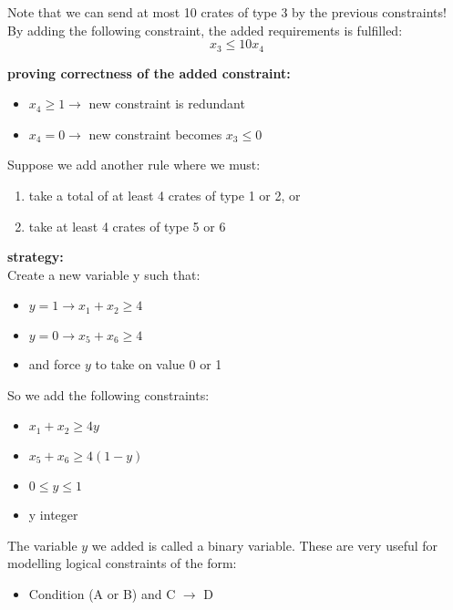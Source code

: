 \documentclass[letterpaper, 12pt]{article}
\begin{document}
    Note that we can send at most 10 crates of type 3 by the previous constraints!\\
    By adding the following constraint, the added requirements is fulfilled:
    $$ x_3 \leq 10x_4$$

    \pagebreak
    \textbf{proving correctness of the added constraint:}
    \begin{itemize}
        \item $x_4 \geq 1 \rightarrow$  new constraint is redundant
        \item $x_4 = 0 \rightarrow$  new constraint becomes $x_3 \leq 0$
    \end{itemize}

    Suppose we add another rule where we must:\\
    \begin{enumerate}
        \item take a total of at least 4 crates of type 1 or 2, or
        \item take at least 4 crates of type 5 or 6
    \end{enumerate}

    \textbf{strategy:}\\
    Create a new variable y such that:
    \begin{itemize}
        \item $y = 1 \rightarrow x_1 + x_2 \geq 4$
        \item $y = 0 \rightarrow x_5 + x_6 \geq 4$
        \item and force $y$ to take on value 0 or 1
    \end{itemize}

    So we add the following constraints:\\
    \begin{itemize}
        \item $x_1 + x_2 \geq 4y$
        \item $x_5 + x_6 \geq 4(1 - y)$
        \item $0 \leq y \leq 1$
        \item y integer
    \end{itemize}

    The variable $y$ we added is called a binary variable. These are very useful for modelling logical constraints of the form:\\
    \begin{itemize}
        \item Condition (A or B) and C $\rightarrow$ D
    \end{itemize}
\end{document}
